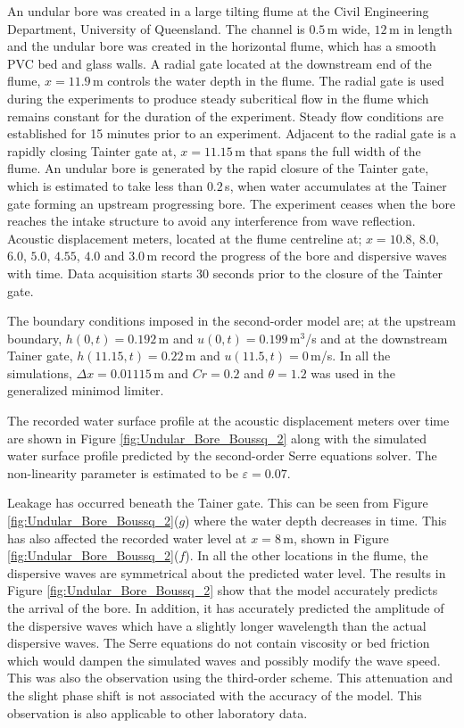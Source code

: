 \documentclass[preprint,sort&compress,1p]{article}
\begin{document}
An undular bore was created in a  large tilting flume at the Civil Engineering Department, University of Queensland. The channel is $0.5$\,m wide, $12$\,m in length and the undular bore was created in the horizontal flume, which has a smooth PVC bed and glass walls. A radial gate located at the downstream end of the flume, $x = 11.9$\,m controls the water depth in the flume. The radial gate is used during the experiments to produce steady subcritical flow in the flume which remains constant for the duration of the experiment. Steady flow conditions are established for 15 minutes prior to an experiment. Adjacent to the radial gate is a rapidly closing Tainter gate at, $x = 11.15$\,m that spans the full width of the flume.  An undular bore is generated by the rapid closure of the Tainter gate, which is estimated to take less than $0.2$\,s, when water accumulates at the Tainer gate forming an upstream progressing bore. The experiment ceases when the bore reaches the intake structure to avoid any interference from wave reflection. Acoustic displacement meters, located at the flume centreline at; $x = 10.8$, $8.0$, $6.0$, $5.0$, $4.55$, $4.0$ and $3.0$\,m record the progress of the bore and dispersive waves with time. Data acquisition starts 30 seconds prior to the closure of the Tainter gate.

The boundary conditions imposed in the second-order model are; at the upstream boundary,  $h(0,t) = 0.192$\,m and $u(0,t) = 0.199$\,m$^3$/s and at the downstream Tainer gate, $h(11.15,t) = 0.22$\,m and $u(11.5,t) = 0$\,m/s. In all the simulations, $\Delta x = 0.01115$\,m and $Cr = 0.2$ and $\theta = 1.2$ was used in the generalized minimod limiter.

The recorded water surface profile at the acoustic displacement meters over time are shown in Figure \ref{fig:Undular_Bore_Boussq_2} along with the simulated water surface profile predicted by the second-order Serre equations solver. The non-linearity parameter is estimated to be $\varepsilon = 0.07$.

Leakage has occurred  beneath the Tainer gate. This can be seen from Figure \ref{fig:Undular_Bore_Boussq_2}($g$) where the water depth decreases in time. This has also affected the recorded water level at $x = 8$\,m, shown in Figure \ref{fig:Undular_Bore_Boussq_2}($f$). In all the other locations in the flume, the dispersive waves are symmetrical about the predicted water level. The results in Figure \ref{fig:Undular_Bore_Boussq_2} show that the model accurately predicts the arrival of the bore.  In addition, it has accurately predicted the amplitude of the dispersive waves which have a slightly longer wavelength than the actual dispersive waves. The Serre equations do not contain viscosity or bed friction which would dampen the simulated waves and possibly modify the wave speed. This was also the observation using the third-order scheme. This attenuation and the slight phase shift is not associated with the accuracy of the model.
This observation is also applicable to other laboratory data.
\end{document}
